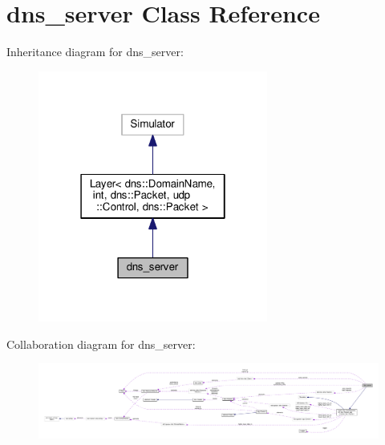 \hypertarget{classdns__server}{}\section{dns\+\_\+server Class Reference}
\label{classdns__server}


Inheritance diagram for dns\+\_\+server\+:\nopagebreak
\begin{figure}[H]
\begin{center}
\leavevmode
\includegraphics[width=214pt]{classdns__server__inherit__graph}
\end{center}
\end{figure}


Collaboration diagram for dns\+\_\+server\+:
\nopagebreak
\begin{figure}[H]
\begin{center}
\leavevmode
\includegraphics[width=350pt]{classdns__server__coll__graph}
\end{center}
\end{figure}
